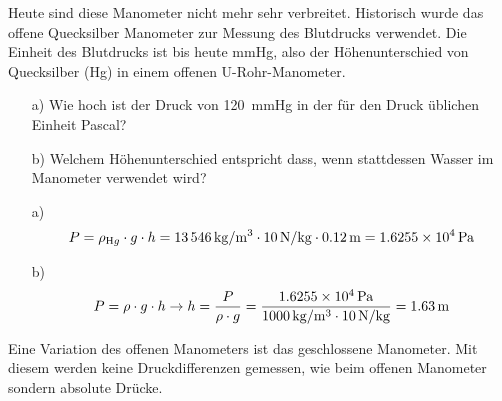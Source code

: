 Heute sind diese Manometer nicht mehr sehr verbreitet.
Historisch wurde das offene Quecksilber Manometer zur Messung des Blutdrucks verwendet.
Die Einheit des Blutdrucks ist bis heute mmHg, also der Höhenunterschied von Quecksilber (Hg)
in einem offenen U-Rohr-Manometer.

\begin{aufgabe}
	\begin{itemize}
		\item[a)] Wie hoch ist der Druck von \SI{120}{mmHg} in der für den Druck üblichen Einheit Pascal?
		\item[b)] Welchem Höhenunterschied entspricht dass, wenn stattdessen Wasser im Manometer verwendet wird?
	\end{itemize}

	\begin{loesung}
	\begin{itemize}
		\item[a)]
		\begin{eqnarray*}
			P=\rho_{\textrm Hg}\cdot g\cdot h = \SI{13546}{kg/m^3}\cdot \SI{10}{N/kg}\cdot\SI{0.12}{m}=\SI{1.6255e+4}{Pa}
		\end{eqnarray*}
	\item[b)]
		\begin{eqnarray*}
			P=\rho\cdot g\cdot h \to h= \frac{P}{\rho\cdot g}=\frac{\SI{1.6255E4}{Pa}}{\SI{1000}{kg/m^3}\cdot \SI{10}{N/kg}}=\SI{1.63}{m}
		\end{eqnarray*}

\end{itemize}
	\end{loesung}
\end{aufgabe}

Eine Variation des offenen Manometers ist das geschlossene Manometer. Mit diesem werden keine Druckdifferenzen gemessen,
wie beim offenen Manometer sondern absolute Drücke.

